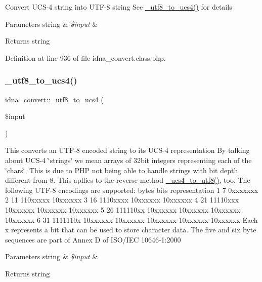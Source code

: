 Convert U\+C\+S-\/4 string into U\+T\+F-\/8 string See \hyperlink{classidna__convert_abafc3eb23a9da5e7b53c5f9f8b7ee035}{\+\_\+utf8\+\_\+to\+\_\+ucs4()} for details 
\begin{DoxyParams}[1]{Parameters}
string & {\em \$input} & \\
\hline
\end{DoxyParams}
\begin{DoxyReturn}{Returns}
string 
\end{DoxyReturn}


Definition at line 936 of file idna\+\_\+convert.\+class.\+php.

\hypertarget{classidna__convert_abafc3eb23a9da5e7b53c5f9f8b7ee035}{}\label{classidna__convert_abafc3eb23a9da5e7b53c5f9f8b7ee035} 
\subsubsection{\texorpdfstring{\+\_\+utf8\+\_\+to\+\_\+ucs4()}{\_utf8\_to\_ucs4()}}
{\footnotesize\ttfamily idna\+\_\+convert\+::\+\_\+utf8\+\_\+to\+\_\+ucs4 (\begin{DoxyParamCaption}\item[{}]{\$input }\end{DoxyParamCaption})\hspace{0.3cm}{\ttfamily [protected]}}

This converts an U\+T\+F-\/8 encoded string to its U\+C\+S-\/4 representation By talking about U\+C\+S-\/4 \char`\"{}strings\char`\"{} we mean arrays of 32bit integers representing each of the \char`\"{}chars\char`\"{}. This is due to P\+HP not being able to handle strings with bit depth different from 8. This apllies to the reverse method \hyperlink{classidna__convert_a3827709d9c0e35a164838064f73daea5}{\+\_\+ucs4\+\_\+to\+\_\+utf8()}, too. The following U\+T\+F-\/8 encodings are supported\+: bytes bits representation 1 7 0xxxxxxx 2 11 110xxxxx 10xxxxxx 3 16 1110xxxx 10xxxxxx 10xxxxxx 4 21 11110xxx 10xxxxxx 10xxxxxx 10xxxxxx 5 26 111110xx 10xxxxxx 10xxxxxx 10xxxxxx 10xxxxxx 6 31 1111110x 10xxxxxx 10xxxxxx 10xxxxxx 10xxxxxx 10xxxxxx Each x represents a bit that can be used to store character data. The five and six byte sequences are part of Annex D of I\+S\+O/\+I\+EC 10646-\/1\+:2000 
\begin{DoxyParams}[1]{Parameters}
string & {\em \$input} & \\
\hline
\end{DoxyParams}
\begin{DoxyReturn}{Returns}
string 
\end{DoxyReturn}



